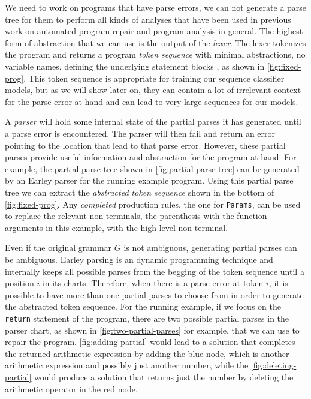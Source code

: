 We need to work on programs that have parse errors, \ie we can not generate a
parse tree for them to perform all kinds of analyses that have been used in
previous work on automated program repair \citep{Sakkas_2020,
Martinez_2013,Gulwani_2018, Wang_2018} and program analysis in general.
%
The highest form of abstraction that we can use is the output of the
\emph{lexer}. The lexer tokenizes the program and returns a program \emph{token
sequence} with minimal abstractions, \eg no variable names, defining the
underlying statement blocks \etc, as shown in \autoref{fig:fixed-prog}. This
token sequence is appropriate for training our sequence classifier models, but
as we will show later on, they can contain a lot of irrelevant context for the
parse error at hand and can lead to very large sequences for our models.

 A \emph{parser} will hold some
internal state of the partial parses it has generated until a parse error is
encountered. The parser will then fail and return an error pointing to the
location that lead to that parse error. However, these partial parses provide
useful information and abstraction for the program at hand. For example, the
partial parse tree shown in \autoref{fig:partial-parse-tree} can be generated by
an Earley parser for the running example program. Using this partial parse tree
we can extract the \emph{abstracted token sequence} shown in the bottom of
\autoref{fig:fixed-prog}. Any \emph{completed} production rules, \eg the
one for \texttt{Params}, can be used to replace the relevant non-terminals,
\eg the parenthesis with the function arguments in this example, with the
high-level non-terminal.





 Even if the original grammar $G$ is
not ambiguous, generating partial parses can be ambiguous. Earley parsing is an
dynamic programming technique and internally keeps all possible parses from the
begging of the token sequence until a position $i$ in its charts. Therefore,
when there is a parse error at token $i$, it is possible to have more than one
partial parses to choose from in order to generate the abstracted token
sequence. For the running example, if we focus on the \texttt{return} statement
of the program, there are two possible partial parses in the parser chart, as
shown in \autoref{fig:two-partial-parses} for example, that we can use to repair
the program. \autoref{fig:adding-partial} would lead to a solution that
completes the returned arithmetic expression by adding the blue node, which is
another arithmetic expression and possibly just another number, while the
\autoref{fig:deleting-partial} would produce a solution that returns just the
number by deleting the arithmetic operator in the red node.

